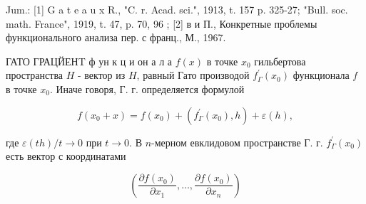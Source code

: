 \documentclass[10pt]{article}
\begin{document}
Jum.: [1] G a t e a u x R., "C. r. Acad. sci.", 1913, t. 157 p. 325-27; "Bull. soc. math. France", 1919, t. 47, p. 70, 96 ; [2] в и П., Конкретные проблемы функционального анализа пер. с франц., М., 1967.



ГАТО ГРАЦЙЕНT ф ун к ц и он а л а $f(x)$ в точке $x_{0}$ гильбертова пространства $H$ - вектор из $H$, равный Гато производой $f_{\Gamma}^{\prime}\left(x_{0}\right)$ функционала $f$ в точке $x_{0}$. Иначе говоря, Г. г. определяется формулой



\[

f\left(x_{0}+x\right)=f\left(x_{0}\right)+\left(f_{\Gamma}^{\prime}\left(x_{0}\right), h\right)+\varepsilon(h),

\]



где $\varepsilon(t h) / t \rightarrow 0$ при $t \rightarrow 0$. В $n$-мерном евклидовом пространстве Г. г. $f_{\Gamma}^{\prime}\left(x_{0}\right)$ есть вектор с координатами



\[

\left(\frac{\partial f\left(x_{0}\right)}{\partial x_{1}}, \ldots, \frac{\partial f\left(x_{0}\right)}{\partial x_{n}}\right)

\]
\end{document}
